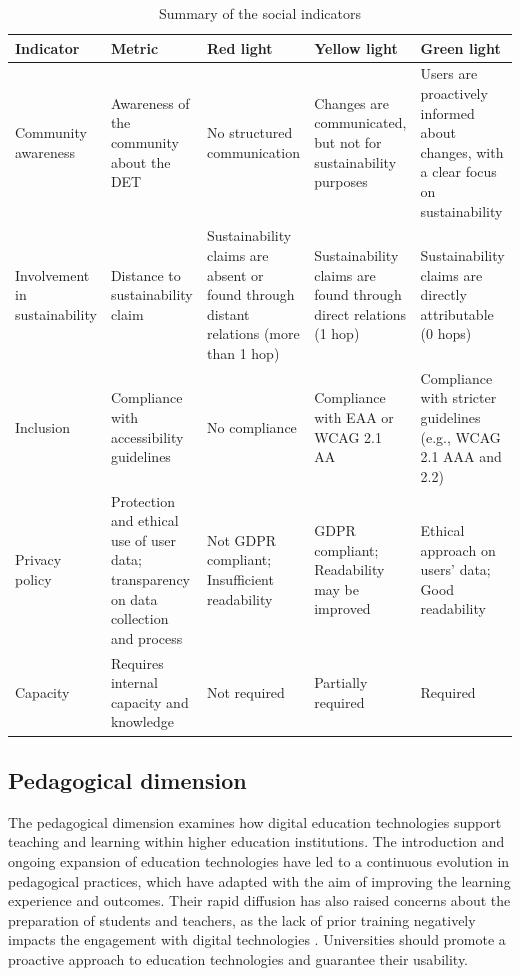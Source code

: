 \begin{table}[ht!]
    \centering
    \small
    \renewcommand{\arraystretch}{1.5} %
    \begin{tabular}{|>{\centering\arraybackslash}m{3cm}|>{\centering\arraybackslash}m{3.1cm}|>{\centering\arraybackslash}m{2.9cm}|>{\centering\arraybackslash}m{2.9cm}|>{\centering\arraybackslash}m{2.9cm}|}
        \hline
        \textbf{Indicator} & \textbf{Metric} & \textbf{Red light} & \textbf{Yellow light} & \textbf{Green light} \\
        \hline
        Community awareness & Awareness of the community about the DET & No structured communication & Changes are communicated, but not for sustainability purposes & Users are proactively informed about changes, with a clear focus on sustainability \\
        \hline
        Involvement in sustainability & Distance to sustainability claim & Sustainability claims are absent or found through distant relations (more than 1 hop) & Sustainability claims are found through direct relations (1 hop) & Sustainability claims are directly attributable (0 hops) \\
        \hline
        Inclusion & Compliance with accessibility guidelines & No compliance & Compliance with EAA or WCAG 2.1 AA & Compliance with stricter guidelines (e.g., WCAG 2.1 AAA and 2.2) \\
        \hline
        Privacy policy & Protection and ethical use of user data; transparency on data collection and process & Not GDPR compliant; Insufficient readability & GDPR compliant; Readability may be improved & Ethical approach on users' data; Good readability \\
        \hline
        Capacity & Requires internal capacity and knowledge & Not required & Partially required & Required \\
        \hline
    \end{tabular}
    \caption{Summary of the social indicators}
    \label{tab:summary_social_indicators}
\end{table}

\newpage %

\subsection{Pedagogical dimension}
The pedagogical dimension examines how digital education technologies support teaching and learning within higher education institutions. The introduction and ongoing expansion of education technologies have led to a continuous evolution in pedagogical practices, which have adapted with the aim of improving the learning experience and outcomes. Their rapid diffusion has also raised concerns about the preparation of students and teachers, as the lack of prior training negatively impacts the engagement with digital technologies \cite{schuetze_digitalization_2024}\cite{sokhulu_students_2021}. Universities should promote a proactive approach to education technologies and guarantee their usability.

